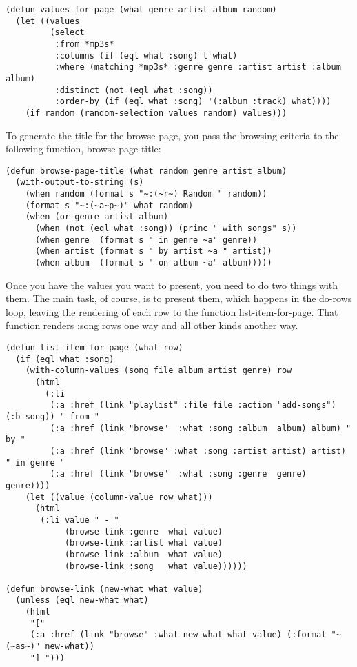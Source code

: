 \begin{lstlisting}
(defun values-for-page (what genre artist album random)
  (let ((values
         (select 
          :from *mp3s*
          :columns (if (eql what :song) t what)
          :where (matching *mp3s* :genre genre :artist artist :album album)
          :distinct (not (eql what :song))
          :order-by (if (eql what :song) '(:album :track) what))))
    (if random (random-selection values random) values)))
\end{lstlisting}

To generate the title for the browse page, you pass the browsing criteria to the following
function, browse-page-title:

\begin{lstlisting}
(defun browse-page-title (what random genre artist album)
  (with-output-to-string (s)
    (when random (format s "~:(~r~) Random " random))
    (format s "~:(~a~p~)" what random)
    (when (or genre artist album)
      (when (not (eql what :song)) (princ " with songs" s))
      (when genre  (format s " in genre ~a" genre))
      (when artist (format s " by artist ~a " artist))
      (when album  (format s " on album ~a" album)))))
\end{lstlisting}

Once you have the values you want to present, you need to do two things with them. The
main task, of course, is to present them, which happens in the do-rows loop, leaving the
rendering of each row to the function list-item-for-page. That function renders :song rows
one way and all other kinds another way.

\begin{lstlisting}
(defun list-item-for-page (what row)
  (if (eql what :song)
    (with-column-values (song file album artist genre) row
      (html
        (:li
         (:a :href (link "playlist" :file file :action "add-songs") (:b song)) " from "
         (:a :href (link "browse"  :what :song :album  album) album) " by "
         (:a :href (link "browse" :what :song :artist artist) artist) " in genre "
         (:a :href (link "browse"  :what :song :genre  genre) genre))))
    (let ((value (column-value row what)))
      (html
       (:li value " - "
            (browse-link :genre  what value)
            (browse-link :artist what value)
            (browse-link :album  what value)
            (browse-link :song   what value))))))

(defun browse-link (new-what what value)
  (unless (eql new-what what)
    (html
     "[" 
     (:a :href (link "browse" :what new-what what value) (:format "~(~as~)" new-what))
     "] ")))
\end{lstlisting}


